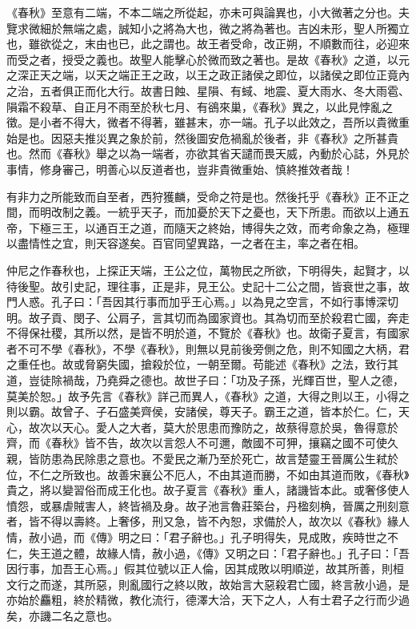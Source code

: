 
《春秋》至意有二端，不本二端之所從起，亦未可與論異也，小大微著之分也。夫覽求微細於無端之處，誠知小之將為大也，微之將為著也。吉凶未形，聖人所獨立也，雖欲從之，末由也已，此之謂也。故王者受命，改正朔，不順數而往，必迎來而受之者，授受之義也。故聖人能擊心於微而致之著也。是故《春秋》之道，以元之深正天之端，以天之端正王之政，以王之政正諸侯之即位，以諸侯之即位正竟內之治，五者俱正而化大行。故書日蝕、星隕、有蜮、地震、夏大雨水、冬大雨雹、隕霜不殺草、自正月不雨至於秋七月、有鵒來巢，《春秋》異之，以此見悖亂之徵。是小者不得大，微者不得著，雖甚末，亦一端。孔子以此效之，吾所以貴微重始是也。因惡夫推災異之象於前，然後圖安危禍亂於後者，非《春秋》之所甚貴也。然而《春秋》舉之以為一端者，亦欲其省天譴而畏天威，內動於心誌，外見於事情，修身審己，明善心以反道者也，豈非貴微重始、慎終推效者哉！


有非力之所能致而自至者，西狩獲麟，受命之符是也。然後托乎《春秋》正不正之間，而明改制之義。一統乎天子，而加憂於天下之憂也，天下所患。而欲以上通五帝，下極三王，以通百王之道，而隨天之終始，博得失之效，而考命象之為，極理以盡情性之宜，則天容遂矣。百官同望異路，一之者在主，率之者在相。


仲尼之作春秋也，上探正天端，王公之位，萬物民之所欲，下明得失，起賢才，以待後聖。故引史記，理往事，正是非，見王公。史記十二公之間，皆衰世之事，故門人惑。孔子曰：「吾因其行事而加乎王心焉。」以為見之空言，不如行事博深切明。故子貢、閔子、公肩子，言其切而為國家資也。其為切而至於殺君亡國，奔走不得保社稷，其所以然，是皆不明於道，不覽於《春秋》也。故衛子夏言，有國家者不可不學《春秋》，不學《春秋》，則無以見前後旁側之危，則不知國之大柄，君之重任也。故或脅窮失國，搶殺於位，一朝至爾。苟能述《春秋》之法，致行其道，豈徒除禍哉，乃堯舜之德也。故世子曰：「功及子孫，光輝百世，聖人之德，莫美於恕。」故予先言《春秋》詳己而異人，《春秋》之道，大得之則以王，小得之則以霸。故曾子、子石盛美齊侯，安諸侯，尊天子。霸王之道，皆本於仁。仁，天心，故次以天心。愛人之大者，莫大於思患而豫防之，故蔡得意於吳，魯得意於齊，而《春秋》皆不告，故次以言怨人不可邇，敵國不可狎，攘竊之國不可使久親，皆防患為民除患之意也。不愛民之漸乃至於死亡，故言楚靈王晉厲公生弒於位，不仁之所致也。故善宋襄公不厄人，不由其道而勝，不如由其道而敗，《春秋》貴之，將以變習俗而成王化也。故子夏言《春秋》重人，諸譏皆本此。或奢侈使人憤怨，或暴虐賊害人，終皆禍及身。故子池言魯莊築台，丹楹刻桷，晉厲之刑刻意者，皆不得以壽終。上奢侈，刑又急，皆不內恕，求備於人，故次以《春秋》緣人情，赦小過，而《傳》明之曰：「君子辭也。」孔子明得失，見成敗，疾時世之不仁，失王道之體，故緣人情，赦小過，《傳》又明之曰：「君子辭也。」孔子曰：「吾因行事，加吾王心焉。」假其位號以正人倫，因其成敗以明順逆，故其所善，則桓文行之而遂，其所惡，則亂國行之終以敗，故始言大惡殺君亡國，終言赦小過，是亦始於麤粗，終於精微，教化流行，德澤大洽，天下之人，人有士君子之行而少過矣，亦譏二名之意也。


